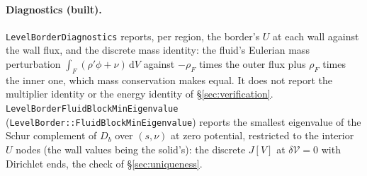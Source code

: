 \documentclass[11pt]{article}
\theoremstyle{definition}
\theoremstyle{remark}
\newcommand{\dV}{\,\mathrm{d}V}
\newcommand{\Vol}{\mathcal V}
\newcommand{\code}[1]{\texttt{#1}}
\begin{document}
\paragraph{Diagnostics (built).} \code{LevelBorderDiagnostics} reports,
per region, the border's $U$ at each wall against the wall flux, and the
discrete mass identity: the fluid's Eulerian mass perturbation
$\int_F(\rho'\phi + \nu)\dV$ against $-\rho_F$ times the outer flux
plus $\rho_F$ times the inner one, which mass conservation makes equal.
It does not report the multiplier identity or the energy identity of
\S\ref{sec:verification}. \code{LevelBorderFluidBlockMinEigenvalue}
(\code{LevelBorder::FluidBlockMinEigenvalue}) reports the smallest eigenvalue of the Schur complement of $D_b$
over $(s, \nu)$ at zero potential, restricted to the interior $U$ nodes
(the wall values being the solid's): the discrete $J[V]$ at
$\delta\Vol = 0$ with Dirichlet ends, the check of
\S\ref{sec:uniqueness}.
\end{document}
